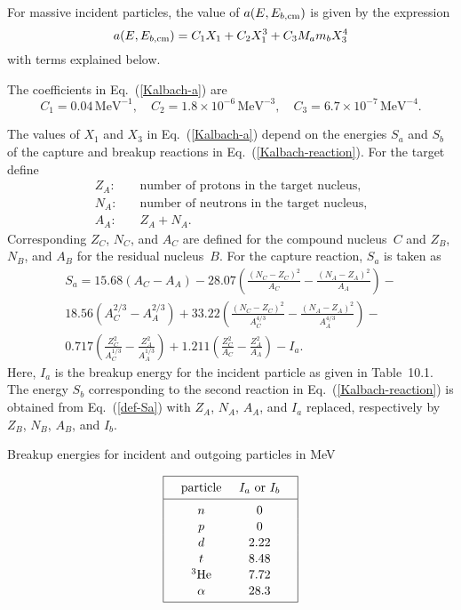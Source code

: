 {For massive incident particles, the value of $a(E, E_{b,\text{cm}})$ is given 
by the expression
\begin{equation}
  a(E, E_{b,\text{cm}}) = C_1 X_1 + C_2 X_1^3 + C_3 M_a m_b X_3^4
 \label{Kalbach-a}
\end{equation}
with terms explained below.

The coefficients in Eq.~(\ref{Kalbach-a}) are
$$
  C_1 = 0.04\,\text{MeV}^{-1}, \quad
  C_2 = 1.8 \times 10^{-6}\,\text{MeV}^{-3}, \quad
  C_3 = 6.7 \times 10^{-7} \,\text{MeV}^{-4}.
$$

The values of $X_1$ and $X_3$ in Eq.~(\ref{Kalbach-a}) depend on
the energies $S_a$ and $S_b$ of the capture and breakup  reactions
in Eq.~(\ref{Kalbach-reaction}).  For the target define
\begin{align*}
  Z_A: \quad & \text{number of protons in the target nucleus,} \\
  N_A: \quad & \text{number of neutrons in the target nucleus,} \\
  A_A: \quad & Z_A + N_A.
\end{align*}
Corresponding $Z_C$, $N_C$, and $A_C$ are defined  
for the compound nucleus~$C$ and
$Z_B$, $N_B$, and $A_B$ for the residual nucleus~$B$.
For the capture reaction,
$S_a$ is taken as
\begin{multline}
  S_a = 15.68(A_C - A_A) -
    28.07\left(
      \frac{(N_C - Z_C)^2}{A_C} - \frac{(N_A - Z_A)^2}{A_A }
    \right) - {} \\
    18.56( A_C^{2/3} - A_A^{2/3}) +
      33.22\left(
        \frac{(N_C - Z_C)^2}{A_C^{4/3}} - \frac{(N_A - Z_A)^2}{A_A^{4/3} }
    \right) - {} \\
    0.717\left(
      \frac{Z_C^2}{A_C^{1/3}} - \frac{Z_A^2}{A_A^{1/3}}
    \right) + 1.211\left(
      \frac{Z_C^2}{A_C} - \frac{Z_A^2}{A_A}
    \right) - I_a.
 \label{def-Sa}
\end{multline}
Here, $I_a$ is the breakup energy for the incident particle
as given in Table~10.1.  The energy $S_b$ corresponding to the second
reaction in Eq.~(\ref{Kalbach-reaction}) is obtained from Eq.~(\ref{def-Sa})
with $Z_A$, $N_A$, $A_A$, and $I_a$ replaced, respectively by
$Z_B$, $N_B$, $A_B$, and $I_b$.

\begin{table}
\caption{Breakup energies for incident and outgoing particles in MeV}
$$
 \vbox{ \offinterlineskip \tabskip = 0.0cm
  \halign{
   \mystrut#\hfil  \tabskip = 0.5cm &
   \hfil#\hfil&
   \hfil#\hfil&  \tabskip = 0cm
   \hfil\vrule#\cr
   \noalign{\hrule}
   height 12pt depth 6pt& particle&  $I_a$ or $I_b$& \cr
   \noalign{\hrule}
   height 12pt& $n$& 0& \cr
   &$p$& 0& \cr
   &$d$& 2.22& \cr
   &$t$& 8.48& \cr
   &${}^3\text{He}$& 7.72& \cr
   depth 6pt &$\alpha$& 28.3& \cr
   \noalign{\hrule}
  }
 }
$$
\end{table}

}
